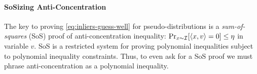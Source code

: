 


\paragraph{SoSizing Anti-Concentration} The key to proving \eqref{eq:inliers-guess-well} for pseudo-distributions is a \emph{sum-of-squares} (SoS) proof of anti-concentration inequality: $\Pr_{x \sim \mathcal I} [\langle x,v\rangle =0] \leq \eta$ in variable $v$. SoS is a restricted system for proving polynomial inequalities subject to polynomial inequality constraints. Thus, to even ask for a SoS proof we must phrase anti-concentration as a polynomial inequality. 

